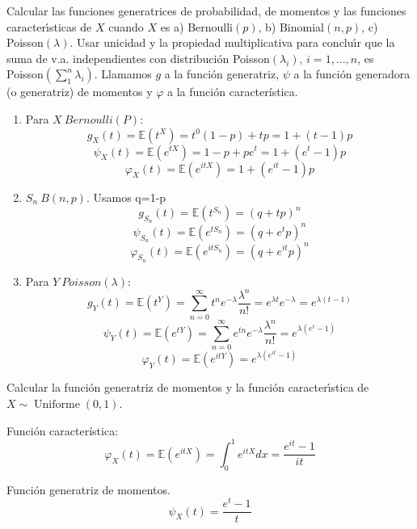 \begin{problem}[4]Calcular las funciones generatrices de probabilidad, de momentos y las funciones caracter\'{\i}sticas de $X$ cuando $X$ es
a) Bernoulli$(p)$,
b) Binomial$(n,p)$,
c) Poisson$(\lambda)$. Usar unicidad y la propiedad multiplicativa para conclu\'{\i}r que la suma de v.a. independientes
con distribuci\'on Poisson$(\lambda_i)$, $i = 1, \dots, n$, es Poisson$(\sum_1^n \lambda_i)$.
\solution
Llamamos $g$ a la función generatriz, $\psi$ a la función generadora (o generatriz) de momentos y $\varphi$ a la función característica.


\begin{enumerate}
\item Para $X~Bernoulli(P)$:
\[
g_X(t)=\mathbb{E}(t^X)=t^0(1-p)+tp=1+(t-1)p
\]
\[
\psi_X(t)=\mathbb{E}(e^{tX})=1-p+pe^t=1+(e^t-1)p
\]
\[
\varphi_X(t)=\mathbb{E}(e^{itX})=1+(e^{it}-1)p
\]

\item $S_n~B(n,p)$. Usamos q=1-p
\[
g_{S_n}(t)=\mathbb{E}(t^{S_n})=(q+tp)^n
\]
\[
\psi_{S_n}(t)=\mathbb{E}(e^{tS_n})=(q+e^tp)^n
\]
\[
\varphi_{S_n}(t)=\mathbb{E}(e^{itS_n})=(q+e^{it}p)^n
\]

\item Para $Y~Poisson(\lambda)$:
\[
g_Y(t)=\mathbb{E}(t^Y)=\sum_{n=0}^{\infty}t^ne^{-\lambda}\frac{\lambda^n}{n!}=e^{\lambda t}e^{-\lambda}=e^{\lambda(t-1)}
\]
\[
\psi_Y(t)=\mathbb{E}(e^{tY})=\sum_{n=0}^{\infty}e^{tn}e^{-\lambda}\frac{\lambda^n}{n!}=e^{\lambda(e^t-1)}
\]
\[
\varphi_Y(t)=\mathbb{E}(e^{itY})=e^{\lambda(e^{it}-1)}
\]
\end{enumerate}



\end{problem}


\begin{problem}[5]Calcular la funci\'on generatriz de momentos y la funci\'on caracter\'{\i}stica de $X\sim \operatorname{Uniforme}(0,1)$. 


\solution
Función característica:
\[
\varphi_X(t)=\mathbb{E}(e^{itX})=\int_{0}^{1}e^{itX}dx=\frac{e^{it}-1}{it}
\]

Función generatriz de momentos.
\[
\psi_X(t)=\frac{e^t-1}{t}
\]




\end{problem}

